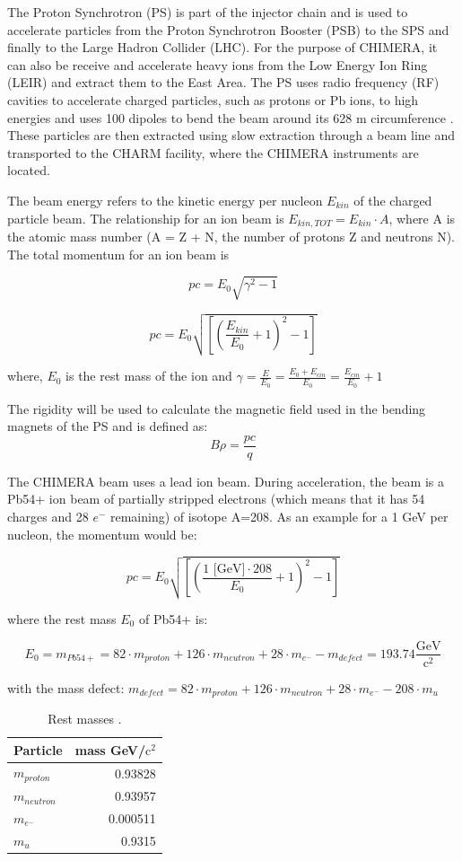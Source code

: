 The Proton Synchrotron (PS) is part of the injector chain and is used to accelerate particles from the Proton Synchrotron Booster (PSB) to the SPS and finally to the Large Hadron Collider (LHC). For the purpose of CHIMERA, it can also be receive and accelerate heavy ions from the Low Energy Ion Ring (LEIR) and extract them to the East Area. The PS uses radio frequency (RF) cavities to accelerate charged particles, such as protons or Pb ions, to high energies and uses 100 dipoles to bend the beam around its 628 m circumference \cite{}. These particles are then extracted using slow extraction through a beam line and transported to the CHARM facility, where the CHIMERA instruments are located.

The beam energy refers to the kinetic energy per nucleon $E_{kin}$ of the charged particle beam. The relationship for an ion beam is $E_{kin, TOT}=E_{kin}\cdot A$, where A is the atomic mass number (A = Z + N, the number of protons Z and neutrons N). The total momentum for an ion beam is \cite{chao_handbook_2013}

$$pc={E_{0}\sqrt{\gamma^{2}-1}}$$

$$pc = E_{0}\sqrt{\left [ \left( \frac{E_{kin}}{E_{0}}+1\right )^{2}-1\right ]}$$

where, $E_{0}$ is the rest mass of the ion and $\gamma=\frac{E}{E_{0}}=\frac{E_{0}+E_{cin}}{E_{0}} = \frac{E_{cin}}{E_{0}}+1$

The rigidity will be used to calculate the magnetic field used in the bending magnets of the PS and is defined as:
$$B\rho = \frac{pc}{q}$$

The CHIMERA beam uses a lead ion beam. During acceleration, the beam is a Pb54+ ion beam of partially stripped electrons (which means that it has 54 charges and 28 $e^{-}$ remaining) of isotope A=208. As an example for a 1 GeV per nucleon, the momentum would be:

$$pc = E_{0}\sqrt{\left [ \left( \frac{1\text{ [GeV]}\cdot 208}{E_{0}}+1\right )^{2}-1\right ]}$$

where the rest mass $E_{0}$ of Pb54+ is:

$$E_{0} = m_{Pb54+}= 82\cdot m_{proton} + 126\cdot m_{neutron} + 28\cdot m_{e^{-}} - m_{defect} = 193.74 \frac{\text{GeV}}{\text{c}^{2}}$$

with the mass defect: $m_{defect}=82\cdot m_{proton} + 126\cdot m_{neutron} + 28\cdot m_{e^{-}} - 208\cdot m_{u}$ 

\begin{table}[h!]
\centering
\begin{tabular}{lr}
\toprule
Particle & mass GeV/$\text{c}^{2}$\\
\midrule
$m_{proton}$ & 0.93828      \\
$m_{neutron}$ & 0.93957      \\
$m_{e^{-}}$ & 0.000511 \\
$m_{u}$ & 0.9315       \\
\bottomrule
\end{tabular}
\caption{Rest masses \cite{boston_university_nuclear_nodate}.}
\label{table:masses}
\end{table}

